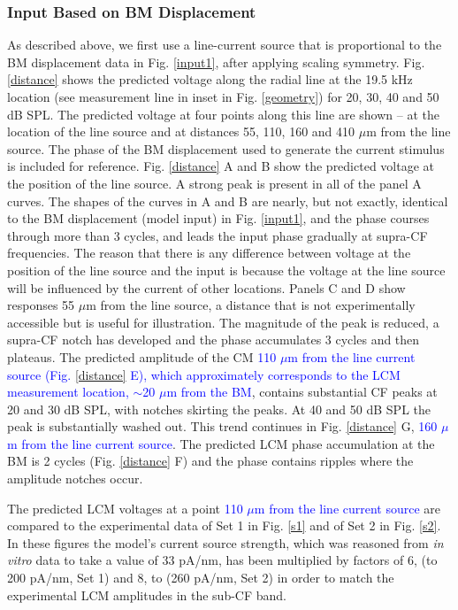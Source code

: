 \documentclass{biophys-new}
\begin{document}
\subsubsection{Input Based on BM Displacement}
\par{As described above, we first use a line-current source that is proportional to the BM displacement data in Fig. \ref{input1}, after applying scaling symmetry. Fig. \ref{distance} shows the predicted voltage along the radial line at the 19.5 kHz location (see measurement line in inset in Fig. \ref{geometry}) for 20, 30, 40 and 50 dB SPL. The predicted voltage at four points along this line are shown -- at the location of the line source and at distances 55, 110, 160 and 410 $\mu$m from the line source. The phase of the BM displacement used to generate the current stimulus is included for reference. Fig. \ref{distance} A and B show the predicted voltage at the position of the line source. A strong peak is present in all of the panel A curves.  The shapes of the curves in A and B are nearly, but not exactly, identical to the BM displacement (model input) in Fig. \ref{input1}, and the phase courses through more than 3 cycles, and leads the input phase gradually at supra-CF frequencies.  The reason that there is any difference between voltage at the position of the line source and the input is because the voltage at the line source will be influenced by the current of other locations.  Panels C and D show responses 55 $\mu$m from the line source, a distance that is not experimentally accessible but is useful for illustration.  The magnitude of the peak is reduced, a supra-CF notch has developed and the phase accumulates 3 cycles and then plateaus. The predicted amplitude of the CM \textcolor{blue}{110 $\mu$m from the line current source (Fig. \ref{distance} E), which approximately corresponds to the LCM measurement location, $\sim$20 $\mu$m from the BM}, contains substantial CF peaks at 20 and 30 dB SPL, with notches skirting the peaks.  At 40 and 50 dB SPL the peak is substantially washed out.  This trend continues in Fig. \ref{distance} G, \textcolor{blue}{160 $\mu$m from the line current source}.  The predicted LCM phase accumulation at the BM is 2 cycles (Fig. \ref{distance} F) and the phase contains ripples where the amplitude notches occur.  

The predicted LCM voltages at a point \textcolor{blue}{110 $\mu$m from the line current source} are compared to the experimental data of Set 1 in Fig. \ref{s1} and of Set 2 in Fig. \ref{s2}.  In these figures the model's current source strength, which was reasoned from \textit{in vitro} data to take a value of 33 pA/nm, has been multiplied by factors of 6, (to 200 pA/nm, Set 1) and 8, to (260 pA/nm, Set 2) in order to match the experimental LCM amplitudes in the sub-CF band.}
\end{document}

